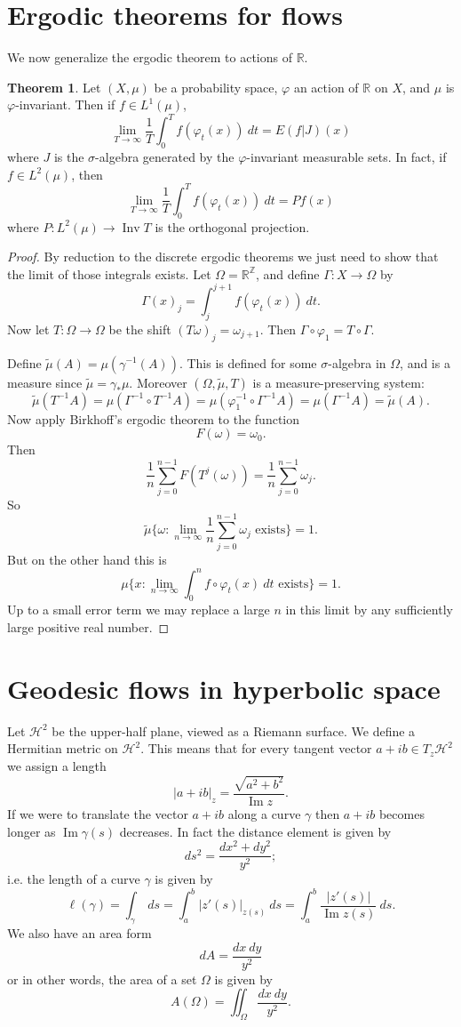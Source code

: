 \documentclass[12pt]{report}
\newcommand{\ZZ}{\mathbb{Z}}
\newcommand{\RR}{\mathbb{R}}
\newcommand{\HH}{\mathcal H}
\DeclareMathOperator*{\Inv}{Inv}
\renewcommand{\Im}{\operatorname{Im}}
\theoremstyle{definition}
\newtheorem{theorem}{Theorem}[chapter]
\begin{document}
\section{Ergodic theorems for flows}
We now generalize the ergodic theorem to actions of $\RR$.
\begin{theorem}
Let $(X, \mu)$ be a probability space, $\varphi$ an action of $\RR$ on $X$, and $\mu$ is $\varphi$-invariant. Then if $f \in L^1(\mu)$,
$$\lim_{T \to \infty} \frac{1}{T} \int_0^T f(\varphi_t(x)) ~dt = E(f|J)(x)$$
where $J$ is the $\sigma$-algebra generated by the $\varphi$-invariant measurable sets. In fact, if $f \in L^2(\mu)$, then
$$\lim_{T \to \infty} \frac{1}{T} \int_0^T f(\varphi_t(x)) ~dt = Pf(x)$$
where $P: L^2(\mu) \to \Inv T$ is the orthogonal projection.
\end{theorem}
\begin{proof}
By reduction to the discrete ergodic theorems we just need to show that the limit of those integrals exists. Let $\Omega = \RR^\ZZ$, and define $\Gamma: X \to \Omega$ by
$$\Gamma(x)_j = \int_j^{j+1} f(\varphi_t(x)) ~dt.$$
Now let $T: \Omega \to \Omega$ be the shift $(T\omega)_j = \omega_{j+1}$. Then $\Gamma \circ \varphi_1 = T \circ \Gamma$.

Define $\tilde \mu(A) = \mu(\gamma^{-1}(A))$. This is defined for some $\sigma$-algebra in $\Omega$, and is a measure since $\tilde \mu = \gamma_*\mu$.
Moreover $(\Omega, \tilde \mu, T)$ is a measure-preserving system:
$$\tilde \mu(T^{-1}A) = \mu(\Gamma^{-1} \circ T^{-1}A) = \mu(\varphi_1^{-1} \circ \Gamma^{-1}A) = \mu(\Gamma^{-1}A) = \tilde \mu(A).$$
Now apply Birkhoff's ergodic theorem to the function
$$F(\omega) = \omega_0.$$
Then
$$\frac{1}{n} \sum_{j=0}^{n-1} F(T^j(\omega)) = \frac{1}{n} \sum_{j=0}^{n-1} \omega_j.$$
So
$$\tilde \mu\{\omega: \lim_{n \to \infty} \frac{1}{n} \sum_{j=0}^{n-1} \omega_j \text{ exists}\} = 1.$$
But on the other hand this is
$$\mu\{x: \lim_{n \to \infty} \int_0^n f \circ \varphi_t(x) ~dt \text{ exists}\} = 1.$$
Up to a small error term we may replace a large $n$ in this limit by any sufficiently large positive real number.
\end{proof}

\section{Geodesic flows in hyperbolic space}
Let $\HH^2$ be the upper-half plane, viewed as a Riemann surface. We define a Hermitian metric on $\HH^2$.
This means that for every tangent vector $a + ib \in T_z\HH^2$ we assign a length
$$|a + ib|_z = \frac{\sqrt{a^2 + b^2}}{\Im z}.$$
If we were to translate the vector $a + ib$ along a curve $\gamma$ then $a + ib$ becomes longer as $\Im \gamma(s)$ decreases.
In fact the distance element is given by
$$ds^2 = \frac{dx^2 + dy^2}{y^2};$$
i.e. the length of a curve $\gamma$ is given by
$$\ell(\gamma) = \int_\gamma ~ds = \int_a^b |z'(s)|_{z(s)} ~ds = \int_a^b \frac{|z'(s)|}{\Im z(s)} ~ds.$$
We also have an area form
$$dA = \frac{dx~dy}{y^2}$$
or in other words, the area of a set $\Omega$ is given by
$$A(\Omega) = \iint_\Omega \frac{dx~dy}{y^2}.$$
\end{document}
